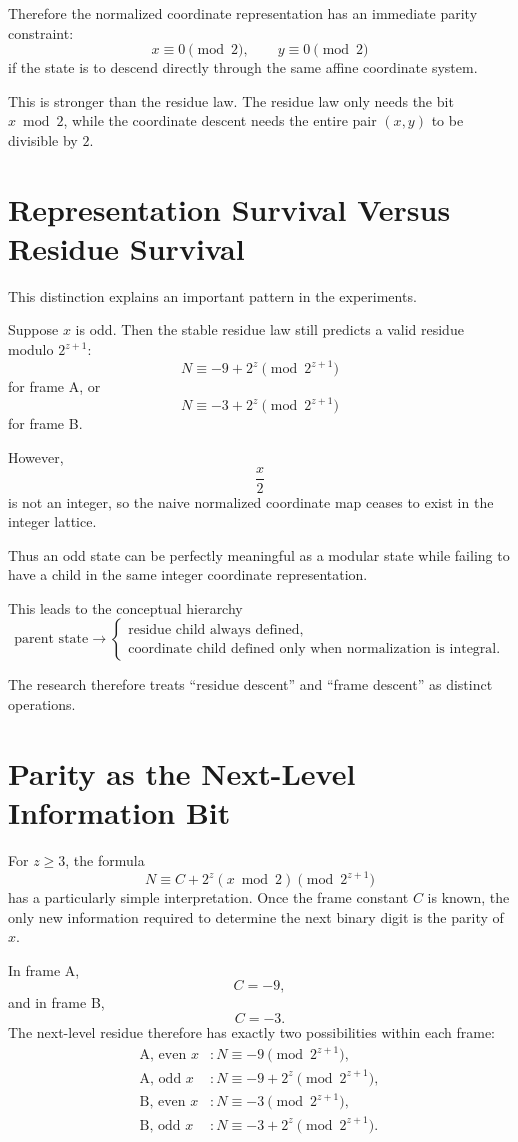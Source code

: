 \documentclass[11pt,a4paper]{article}
\theoremstyle{definition}
\theoremstyle{remark}
\begin{document}
Therefore the normalized coordinate representation has an immediate parity constraint:
\begin{equation}
 x\equiv0\pmod2,
 \qquad
 y\equiv0\pmod2
\end{equation}
if the state is to descend directly through the same affine coordinate system.

This is stronger than the residue law. The residue law only needs the bit $x\bmod2$, while the coordinate descent needs the entire pair $(x,y)$ to be divisible by $2$.

\section{Representation Survival Versus Residue Survival}

This distinction explains an important pattern in the experiments.

Suppose $x$ is odd. Then the stable residue law still predicts a valid residue modulo $2^{z+1}$:
\[
N\equiv -9+2^z\pmod{2^{z+1}}
\]
for frame A, or
\[
N\equiv -3+2^z\pmod{2^{z+1}}
\]
for frame B.

However,
\[
\frac{x}{2}
\]
is not an integer, so the naive normalized coordinate map ceases to exist in the integer lattice.

Thus an odd state can be perfectly meaningful as a modular state while failing to have a child in the same integer coordinate representation.

This leads to the conceptual hierarchy
\[
\text{parent state}
\longrightarrow
\begin{cases}
\text{residue child always defined},\\
\text{coordinate child defined only when normalization is integral}.
\end{cases}
\]

The research therefore treats ``residue descent'' and ``frame descent'' as distinct operations.

\section{Parity as the Next-Level Information Bit}

For $z\ge3$, the formula
\[
N\equiv C+2^z(x\bmod2)\pmod{2^{z+1}}
\]
has a particularly simple interpretation. Once the frame constant $C$ is known, the only new information required to determine the next binary digit is the parity of $x$.

In frame A,
\[
C=-9,
\]
and in frame B,
\[
C=-3.
\]
The next-level residue therefore has exactly two possibilities within each frame:
\begin{align}
\text{A, even }x &: N\equiv-9\pmod{2^{z+1}},\\
\text{A, odd }x  &: N\equiv-9+2^z\pmod{2^{z+1}},\\
\text{B, even }x &: N\equiv-3\pmod{2^{z+1}},\\
\text{B, odd }x  &: N\equiv-3+2^z\pmod{2^{z+1}}.
\end{align}
\end{document}
